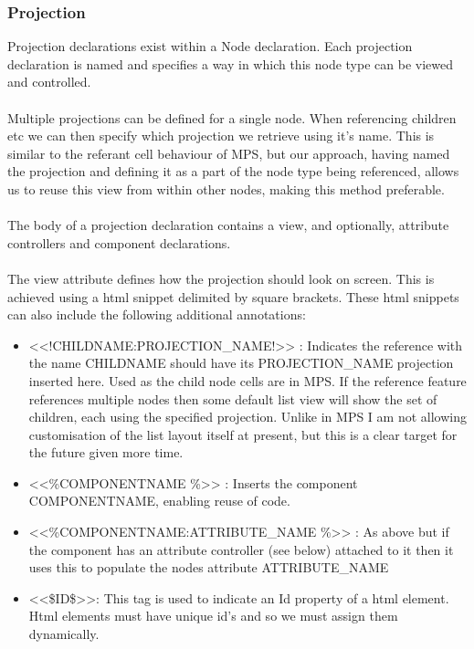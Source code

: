 \documentclass{article}
\begin{document}
\subsubsection{Projection}
Projection declarations exist within a Node declaration. Each projection declaration is named and specifies a way in which this node type can be viewed and controlled.
\\
\\
Multiple projections can be defined for a single node. When referencing children etc we can then specify which projection we retrieve using it's name. This is similar to the referant cell behaviour of MPS, but our approach, having named the projection and defining it as a part of the node type being referenced, allows us to reuse this view from within other nodes, making this method preferable.
\\
\\
The body of a projection declaration contains a view, and optionally, attribute controllers and component declarations.
\\
\\
The view attribute defines how the projection should look on screen. This is achieved using a html snippet delimited by square brackets.  These html snippets can also include the following additional annotations:
\begin{itemize}
\item <<!CHILDNAME:PROJECTION\_NAME!>> : Indicates the reference with the name CHILDNAME should have its PROJECTION\_NAME projection inserted here. Used as the child node cells are in MPS. If the reference feature references multiple nodes then some default list view will show the set of children, each using the specified projection. Unlike in MPS I am not allowing customisation of the list layout itself at present, but this is a clear target for the future given more time.
\item <<\%COMPONENTNAME \%>> : Inserts the component COMPONENTNAME, enabling reuse of code.
\item <<\%COMPONENTNAME:ATTRIBUTE\_NAME \%>> : As above but if the component has an attribute controller (see below) attached to it then it uses this to populate the nodes attribute ATTRIBUTE\_NAME
\item <<\$ID\$>>: This tag is used to indicate an Id property of a html element. Html elements must have unique id's and so we must assign them dynamically.
\end{itemize}
\end{document}
